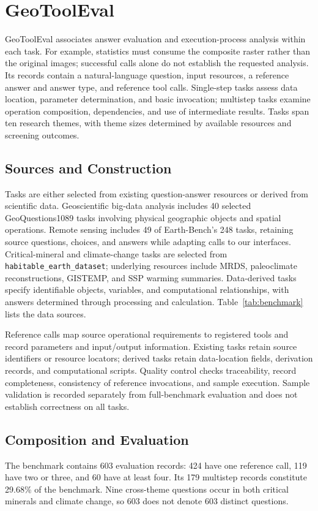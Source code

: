 \section{GeoToolEval}
\label{sec:benchmark}
GeoToolEval associates answer evaluation and execution-process analysis within each task. For example, statistics must consume the composite raster rather than the original images; successful calls alone do not establish the requested analysis. Its records contain a natural-language question, input resources, a reference answer and answer type, and reference tool calls. Single-step tasks assess data location, parameter determination, and basic invocation; multistep tasks examine operation composition, dependencies, and use of intermediate results. Tasks span ten research themes, with theme sizes determined by available resources and screening outcomes.

\subsection{Sources and Construction}
Tasks are either selected from existing question-answer resources or derived from scientific data. Geoscientific big-data analysis includes 40 selected GeoQuestions1089 tasks involving physical geographic objects and spatial operations. Remote sensing includes 49 of Earth-Bench's 248 tasks, retaining source questions, choices, and answers while adapting calls to our interfaces. Critical-mineral and climate-change tasks are selected from \nolinkurl{habitable_earth_dataset}; underlying resources include MRDS, paleoclimate reconstructions, GISTEMP, and SSP warming summaries. Data-derived tasks specify identifiable objects, variables, and computational relationships, with answers determined through processing and calculation. Table~\ref{tab:benchmark} lists the data sources.

Reference calls map source operational requirements to registered tools and record parameters and input/output information. Existing tasks retain source identifiers or resource locators; derived tasks retain data-location fields, derivation records, and computational scripts. Quality control checks traceability, record completeness, consistency of reference invocations, and sample execution. Sample validation is recorded separately from full-benchmark evaluation and does not establish correctness on all tasks.



\subsection{Composition and Evaluation}
\label{sec:metrics}
The benchmark contains 603 evaluation records: 424 have one reference call, 119 have two or three, and 60 have at least four. Its 179 multistep records constitute 29.68\% of the benchmark. Nine cross-theme questions occur in both critical minerals and climate change, so 603 does not denote 603 distinct questions.

